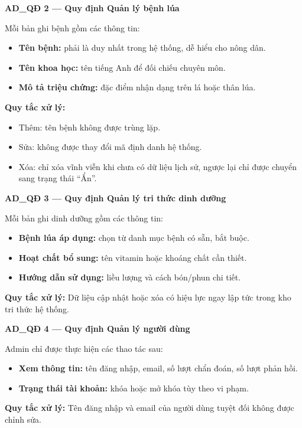 \documentclass[12pt,a4paper]{article}
\begin{document}
\vspace{0.3cm}
\noindent\textbf{AD\_QĐ 2 --- Quy định Quản lý bệnh lúa}

Mỗi bản ghi bệnh gồm các thông tin:
\begin{itemize}
    \item \textbf{Tên bệnh:} phải là duy nhất trong hệ thống, dễ hiểu cho nông dân.
    \item \textbf{Tên khoa học:} tên tiếng Anh để đối chiếu chuyên môn.
    \item \textbf{Mô tả triệu chứng:} đặc điểm nhận dạng trên lá hoặc thân lúa.
\end{itemize}
\textbf{Quy tắc xử lý:}
\begin{itemize}
    \item Thêm: tên bệnh không được trùng lặp.
    \item Sửa: không được thay đổi mã định danh hệ thống.
    \item Xóa: chỉ xóa vĩnh viễn khi chưa có dữ liệu lịch sử, ngược lại chỉ được chuyển sang trạng thái ``Ẩn''.
\end{itemize}

\vspace{0.3cm}
\noindent\textbf{AD\_QĐ 3 --- Quy định Quản lý tri thức dinh dưỡng}

Mỗi bản ghi dinh dưỡng gồm các thông tin:
\begin{itemize}
    \item \textbf{Bệnh lúa áp dụng:} chọn từ danh mục bệnh có sẵn, bắt buộc.
    \item \textbf{Hoạt chất bổ sung:} tên vitamin hoặc khoáng chất cần thiết.
    \item \textbf{Hướng dẫn sử dụng:} liều lượng và cách bón/phun chi tiết.
\end{itemize}
\textbf{Quy tắc xử lý:} Dữ liệu cập nhật hoặc xóa có hiệu lực ngay lập tức trong kho tri thức hệ thống.

\vspace{0.3cm}
\noindent\textbf{AD\_QĐ 4 --- Quy định Quản lý người dùng}

Admin chỉ được thực hiện các thao tác sau:
\begin{itemize}
    \item \textbf{Xem thông tin:} tên đăng nhập, email, số lượt chẩn đoán, số lượt phản hồi.
    \item \textbf{Trạng thái tài khoản:} khóa hoặc mở khóa tùy theo vi phạm.
\end{itemize}
\textbf{Quy tắc xử lý:} Tên đăng nhập và email của người dùng tuyệt đối không được chỉnh sửa.
\end{document}
